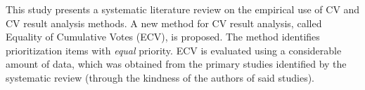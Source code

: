 This study presents a systematic literature review on the empirical use of CV and CV result analysis methods.
A new method for CV result analysis, called Equality of Cumulative Votes (ECV), is proposed.
The method identifies prioritization items with \emph{equal} priority.
ECV is evaluated using a considerable amount of data, which was obtained from the primary studies identified by the systematic review (through the kindness of the authors of said studies).

